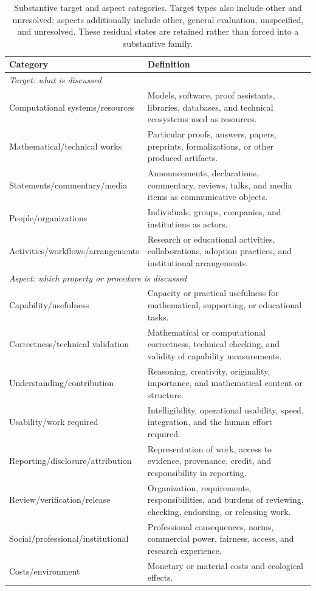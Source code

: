 \documentclass[sigconf,balance=false]{acmart}
\begin{document}
\begin{table}[tp]
\caption{Substantive target and aspect categories. Target types also include other and unresolved; aspects additionally include other, general evaluation, unspecified, and unresolved. These residual states are retained rather than forced into a substantive family.}
\label{tab:taxonomy}
\centering
\begin{tabularx}{\textwidth}{lX}
\toprule
Category & Definition\\
\midrule
\multicolumn{2}{l}{\emph{Target: what is discussed}}\\
Computational systems/resources & Models, software, proof assistants, libraries, databases, and technical ecosystems used as resources.\\
Mathematical/technical works & Particular proofs, answers, papers, preprints, formalizations, or other produced artifacts.\\
Statements/commentary/media & Announcements, declarations, commentary, reviews, talks, and media items as communicative objects.\\
People/organizations & Individuals, groups, companies, and institutions as actors.\\
Activities/workflows/arrangements & Research or educational activities, collaborations, adoption practices, and institutional arrangements.\\
\midrule
\multicolumn{2}{l}{\emph{Aspect: which property or procedure is discussed}}\\
Capability/usefulness & Capacity or practical usefulness for mathematical, supporting, or educational tasks.\\
Correctness/technical validation & Mathematical or computational correctness, technical checking, and validity of capability measurements.\\
Understanding/contribution & Reasoning, creativity, originality, importance, and mathematical content or structure.\\
Usability/work required & Intelligibility, operational usability, speed, integration, and the human effort required.\\
Reporting/disclosure/attribution & Representation of work, access to evidence, provenance, credit, and responsibility in reporting.\\
Review/verification/release & Organization, requirements, responsibilities, and burdens of reviewing, checking, endorsing, or releasing work.\\
Social/professional/institutional & Professional consequences, norms, commercial power, fairness, access, and research experience.\\
Costs/environment & Monetary or material costs and ecological effects.\\
\bottomrule
\end{tabularx}
\end{table}
\end{document}
